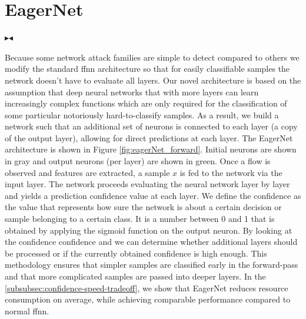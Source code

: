 \documentclass[conference]{IEEEtran}
\newcommand{\mynote}[3]{
    \fbox{\bfseries\sffamily\scriptsize#1}
    {\small$\blacktriangleright$\textsf{\emph{\color{#3}{#2}}}$\blacktriangleleft$}}
\newcommand{\todo}[1]{\mynote{TODO}{#1}{red}}
\begin{document}
\section{EagerNet}

\todo{Max: $X$ is generally for matrices as far as I know while $x$ is for vectors.}

Because some network attack families are simple to detect compared to others we modify the standard \gls{ffnn} architecture so that for easily classifiable samples the network doesn't have to evaluate all layers. Our novel architecture is based on the assumption that deep neural networks that with more layers can learn increasingly complex functions which are only required for the classification of some particular notoriously hard-to-classify samples. As a result, we build a network such that an additional set of neurons is connected to each layer (a copy of the output layer), allowing for direct predictions at each layer. The EagerNet architecture is shown in Figure \ref{fig:eagerNet_forward}. Initial neurons are shown in gray and output neurons (per layer) are shown in green. Once a flow is observed and features are extracted, a sample $x$ is fed to the network via the input layer. The network proceeds evaluating the neural network layer by layer and yields a prediction confidence value at each layer. We define the confidence as the value that represents how sure the network is about a certain decision or sample belonging to a certain class. It is a number between 0 and 1 that is obtained by applying the sigmoid function \cite{noauthor_sigmoid_2020} on the output neuron. By looking at the confidence confidence and we can determine whether additional layers should be processed or if the currently obtained confidence is high enough. This methodology ensures that simpler samples are classified early in the forward-pass and that more complicated samples are passed into deeper layers. In the \autoref{subsubsec:confidence-speed-tradeoff}, we show that EagerNet reduces resource consumption on average, while achieving comparable performance compared to normal \gls{ffnn}.
\end{document}
